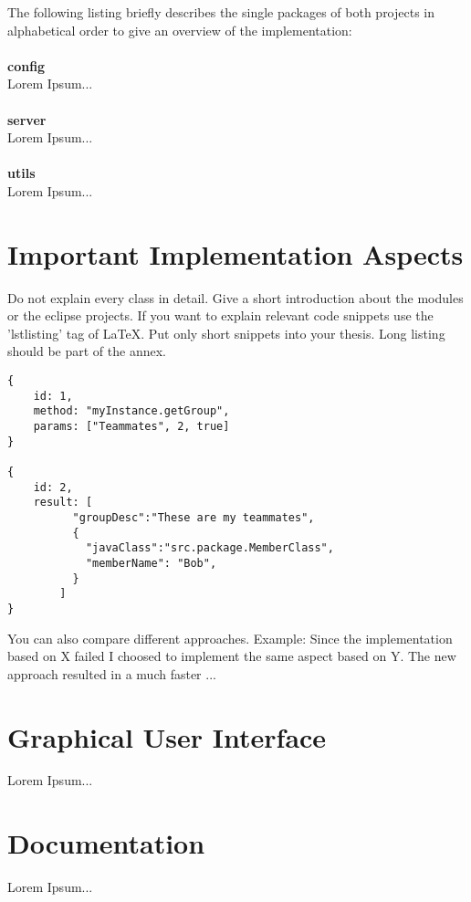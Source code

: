 \noindent
The following listing briefly describes the single packages of both projects in alphabetical order to give an overview of the implementation:
\\
\\
\textbf{config} 
\\
Lorem Ipsum...
\\
\\
\textbf{server} 
\\
Lorem Ipsum...
\\
\\
\textbf{utils} 
\\
Lorem Ipsum...

\section{Important Implementation Aspects\label{sec:implaspects}}

Do not explain every class in detail. Give a short introduction about the modules or the eclipse projects. If you want to explain relevant code snippets use the 'lstlisting' tag of LaTeX. Put only short snippets into your thesis. Long listing should be part of the annex.

\lstset{caption=JSON String Code Snippet,label=jsonstring,showstringspaces=false}
\begin{lstlisting}
{
	id: 1,
	method: "myInstance.getGroup",
	params: ["Teammates", 2, true]
}

{
	id: 2,
	result: [
		  "groupDesc":"These are my teammates",
		  {
			"javaClass":"src.package.MemberClass",
			"memberName": "Bob",      
		  }
		]
}\end{lstlisting}

You can also compare different approaches. Example: Since the implementation based on X failed I choosed to implement the same aspect based on Y. The new approach resulted in a much faster ...

\section{Graphical User Interface\label{sec:gui}}

Lorem Ipsum...

\section{Documentation\label{sec:docu}}

Lorem Ipsum...


